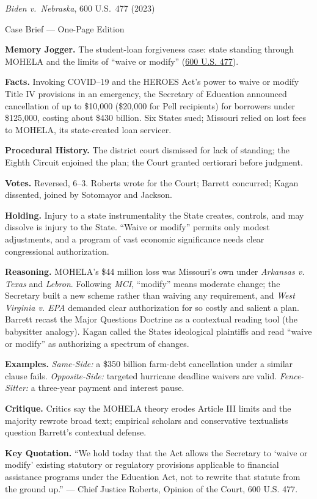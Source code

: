 \documentclass[12pt]{article}
\begin{document}
\begin{center}
{\Large \textit{Biden v.\ Nebraska}, 600 U.S.\ 477 (2023)\par}
\vspace{0.3em}
{\normalsize Case Brief --- One-Page Edition\par}
\end{center}

\textbf{Memory Jogger.} The student-loan forgiveness case: state standing through MOHELA and the limits of ``waive or modify'' (\href{https://www.law.cornell.edu/supremecourt/text/22-506}{600 U.S. 477}).

\textbf{Facts.} Invoking COVID--19 and the HEROES Act's power to waive or modify Title IV provisions in an emergency, the Secretary of Education announced cancellation of up to \$10,000 (\$20,000 for Pell recipients) for borrowers under \$125,000, costing about \$430 billion. Six States sued; Missouri relied on lost fees to MOHELA, its state-created loan servicer.

\textbf{Procedural History.} The district court dismissed for lack of standing; the Eighth Circuit enjoined the plan; the Court granted certiorari before judgment.

\textbf{Votes.} Reversed, 6--3. Roberts wrote for the Court; Barrett concurred; Kagan dissented, joined by Sotomayor and Jackson.

\textbf{Holding.} Injury to a state instrumentality the State creates, controls, and may dissolve is injury to the State. ``Waive or modify'' permits only modest adjustments, and a program of vast economic significance needs clear congressional authorization.

\textbf{Reasoning.} MOHELA's \$44 million loss was Missouri's own under \textit{Arkansas v. Texas} and \textit{Lebron}. Following \textit{MCI}, ``modify'' means moderate change; the Secretary built a new scheme rather than waiving any requirement, and \textit{West Virginia v. EPA} demanded clear authorization for so costly and salient a plan. Barrett recast the Major Questions Doctrine as a contextual reading tool (the babysitter analogy). Kagan called the States ideological plaintiffs and read ``waive or modify'' as authorizing a spectrum of changes.

\textbf{Examples.} \emph{Same-Side:} a \$350 billion farm-debt cancellation under a similar clause fails. \emph{Opposite-Side:} targeted hurricane deadline waivers are valid. \emph{Fence-Sitter:} a three-year payment and interest pause.

\textbf{Critique.} Critics say the MOHELA theory erodes Article III limits and the majority rewrote broad text; empirical scholars and conservative textualists question Barrett's contextual defense.

\textbf{Key Quotation.} ``We hold today that the Act allows the Secretary to `waive or modify' existing statutory or regulatory provisions applicable to financial assistance programs under the Education Act, not to rewrite that statute from the ground up.'' --- Chief Justice Roberts, Opinion of the Court, 600 U.S. 477.
\end{document}
